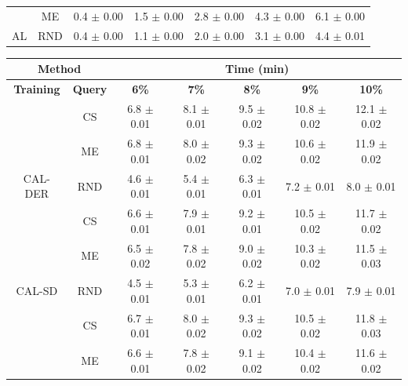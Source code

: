\begin{table}[htbp]
\begin{tabular*}{\linewidth}{c|c|@{\extracolsep{\fill}}ccccc}
 & ME & 0.4 $\pm$ {\small 0.00} & 1.5 $\pm$ {\small 0.00} & 2.8 $\pm$ {\small 0.00} & 4.3 $\pm$ {\small 0.00} & 6.1 $\pm$ {\small 0.00}\\

\multirow{-3}{*}{\raggedright\arraybackslash AL} & RND & 0.4 $\pm$ {\small 0.00} & 1.1 $\pm$ {\small 0.00} & 2.0 $\pm$ {\small 0.00} & 3.1 $\pm$ {\small 0.00} & 4.4 $\pm$ {\small 0.01}\\
\bottomrule
\end{tabular*}
\vspace{0.5em}

\begin{tabular*}{\linewidth}{c|c|@{\extracolsep{\fill}}ccccc}
\toprule
\multicolumn{2}{c|}{\textbf{Method}} & \multicolumn{5}{c}{\textbf{Time (min)}} \\
\midrule
\textbf{Training} & \textbf{Query} & \textbf{6\%} & \textbf{7\%} & \textbf{8\%} & \textbf{9\%} & \textbf{10\%}\\
\midrule
 & CS & 6.8 $\pm$ {\small 0.01} & 8.1 $\pm$ {\small 0.01} & 9.5 $\pm$ {\small 0.02} & 10.8 $\pm$ {\small 0.02} & 12.1 $\pm$ {\small 0.02}\\

 & ME & 6.8 $\pm$ {\small 0.01} & 8.0 $\pm$ {\small 0.02} & 9.3 $\pm$ {\small 0.02} & 10.6 $\pm$ {\small 0.02} & 11.9 $\pm$ {\small 0.02}\\

\multirow{-3}{*}{\raggedright\arraybackslash CAL-DER} & RND & 4.6 $\pm$ {\small 0.01} & 5.4 $\pm$ {\small 0.01} & 6.3 $\pm$ {\small 0.01} & 7.2 $\pm$ {\small 0.01} & 8.0 $\pm$ {\small 0.01}\\
\midrule
 & CS & 6.6 $\pm$ {\small 0.01} & 7.9 $\pm$ {\small 0.01} & 9.2 $\pm$ {\small 0.01} & 10.5 $\pm$ {\small 0.02} & 11.7 $\pm$ {\small 0.02}\\

 & ME & 6.5 $\pm$ {\small 0.02} & 7.8 $\pm$ {\small 0.02} & 9.0 $\pm$ {\small 0.02} & 10.3 $\pm$ {\small 0.02} & 11.5 $\pm$ {\small 0.03}\\

\multirow{-3}{*}{\raggedright\arraybackslash CAL-SD} & RND & 4.5 $\pm$ {\small 0.01} & 5.3 $\pm$ {\small 0.01} & 6.2 $\pm$ {\small 0.01} & 7.0 $\pm$ {\small 0.01} & 7.9 $\pm$ {\small 0.01}\\
\midrule
 & CS & 6.7 $\pm$ {\small 0.01} & 8.0 $\pm$ {\small 0.02} & 9.3 $\pm$ {\small 0.02} & 10.5 $\pm$ {\small 0.02} & 11.8 $\pm$ {\small 0.03}\\

 & ME & 6.6 $\pm$ {\small 0.01} & 7.8 $\pm$ {\small 0.02} & 9.1 $\pm$ {\small 0.02} & 10.4 $\pm$ {\small 0.02} & 11.6 $\pm$ {\small 0.02}\\


\end{tabular*}
\end{table}
